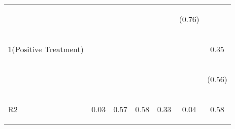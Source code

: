 \begin{center}
\begin{tabular}{lcccccc}
 & \begin{footnotesize}\end{footnotesize} & \begin{footnotesize}\end{footnotesize} & \begin{footnotesize}\end{footnotesize} & \begin{footnotesize}\end{footnotesize} & \begin{footnotesize}(0.76)\end{footnotesize} & \begin{footnotesize}\end{footnotesize}\\
\noalign{\smallskip}1(Positive Treatment) & \begin{footnotesize}\end{footnotesize} & \begin{footnotesize}\end{footnotesize} & \begin{footnotesize}\end{footnotesize} & \begin{footnotesize}\end{footnotesize} & \begin{footnotesize}\end{footnotesize} & \begin{footnotesize}0.35\end{footnotesize}\\
 & \begin{footnotesize}\end{footnotesize} & \begin{footnotesize}\end{footnotesize} & \begin{footnotesize}\end{footnotesize} & \begin{footnotesize}\end{footnotesize} & \begin{footnotesize}\end{footnotesize} & \begin{footnotesize}(0.56)\end{footnotesize}\\
\noalign{\smallskip}R2  & \begin{footnotesize}0.03\end{footnotesize} & \begin{footnotesize}0.57\end{footnotesize} & \begin{footnotesize}0.58\end{footnotesize} & \begin{footnotesize}0.33\end{footnotesize} & \begin{footnotesize}0.04\end{footnotesize} & \begin{footnotesize}0.58\end{footnotesize}\\

\end{tabular}
\end{center}
